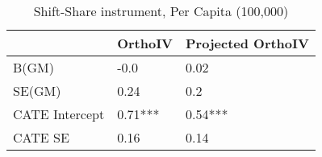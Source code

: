\begin{table}\centering\caption{Shift-Share instrument, Per Capita (100,000)}\begin{tabular}{lll}
\toprule
                & OrthoIV   & Projected OrthoIV   \\
\midrule
 B(GM)          & -0.0      & 0.02                \\
 SE(GM)         & 0.24      & 0.2                 \\
 CATE Intercept & 0.71***   & 0.54***             \\
 CATE SE        & 0.16      & 0.14                \\
\bottomrule
\end{tabular}\end{table}